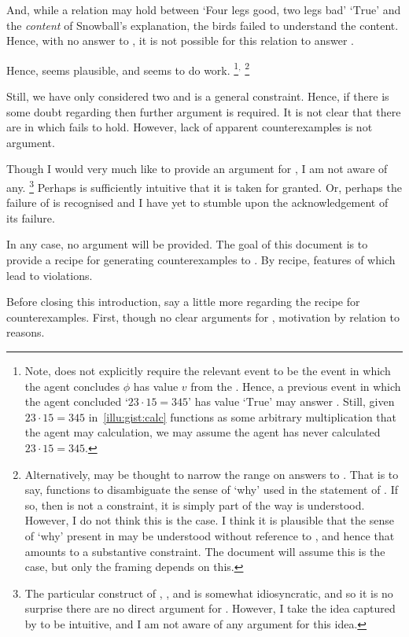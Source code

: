 \begin{note}
\begin{itemize}[noitemsep]
    And, while a relation may hold between `Four legs good, two legs bad' `\(\text{True}\)' and the \emph{content} of Snowball's explanation, the birds failed to understand the content.
    Hence, with no answer to \qHow{}, it is not possible for this relation to answer \qWhy{}.
  \end{itemize}
  Hence, \issueInclusion{} seems plausible, and seems to do work.%
  \footnote{
    Note, \qHow{} does not explicitly require the relevant event to be the event in which the agent concludes \(\phi\) has value \(v\) from the \pool{}.
    Hence, a previous event in which the agent concluded `\(23 \cdot 15 = 345\)' has value `\(\text{True}\)' may answer \qHow{}.
    Still, given \(23 \cdot 15 = 345\) in~\autoref{illu:gist:calc} functions as some arbitrary multiplication that the agent may calculation, we may assume the agent has never calculated \(23 \cdot 15 = 345\).
  }\(^{,}\)%
  \footnote{
    Alternatively, \issueInclusion{} may be thought to narrow the range on answers to \qWhy{}.
    That is to say, \issueInclusion{} functions to disambiguate the sense of `why' used in the statement of \qWhy{}.
    If so, then \issueInclusion{} is not a constraint, it is simply part of the way \qWhy{} is understood.
    However, I do not think this is the case.
    I think it is plausible that the sense of `why' present in \qWhy{} may be understood without reference to \issueInclusion{}, and hence that \issueInclusion{} amounts to a substantive constraint.
    The document will assume this is the case, but only the framing depends on this.
  }
\end{note}

\begin{note}
  Still, we have only considered two  and \issueInclusion{} is a general constraint.
  Hence, if there is some doubt regarding \issueInclusion{} then further argument is required.
  It is not clear that there are  in which \issueInclusion{} fails to hold.
  However, lack of apparent counterexamples is not argument.

  Though I would very much like to provide an argument for \issueInclusion{}, I am not aware of any.%
  \footnote{
    The particular construct of \qWhy{}, \qHow{}, and \issueInclusion{} is somewhat idiosyncratic, and so it is no surprise there are no direct argument for \issueInclusion{}.
    However, I take the idea captured by \issueInclusion{} to be intuitive, and I am not aware of any argument for this idea.
  }
  Perhaps \issueInclusion{} is sufficiently intuitive that it is taken for granted.
  Or, perhaps the failure of \issueInclusion{} is recognised and I have yet to stumble upon the acknowledgement of its failure.

  In any case, no argument will be provided.
  The goal of this document is to provide a recipe for generating counterexamples to \issueInclusion{}.
  By recipe, features of  which lead to violations.

  Before closing this introduction, say a little more regarding the recipe for counterexamples.
  First, though no clear arguments for \issueInclusion{}, motivation by relation to reasons.
\end{note}

